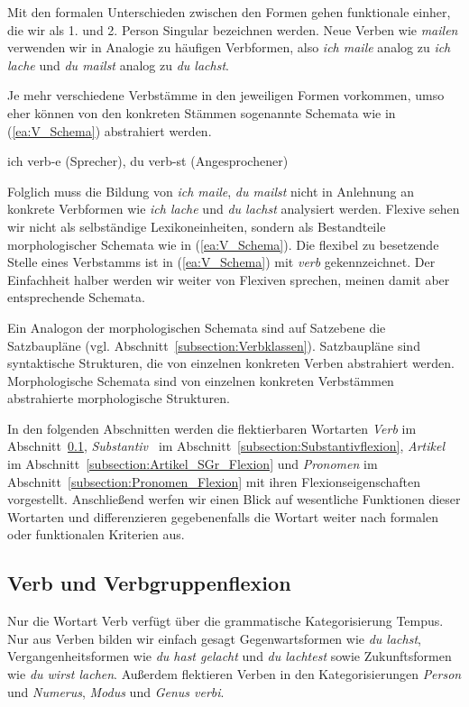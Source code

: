 Mit den formalen Unterschieden zwischen den Formen gehen funktionale einher, die wir als 1. und 2. Person Singular bezeichnen werden. Neue Verben wie \textit{mailen} verwenden wir in Analogie zu häufigen Verbformen, also \textit{ich maile} analog zu \textit{ich lache} und \textit{du mailst} analog zu \textit{du lachst}.

Je mehr verschiedene Verbstämme in den jeweiligen Formen vorkommen, umso eher können von den konkreten Stämmen sogenannte Schemata wie in (\ref{ea:V_Schema}) abstrahiert werden.

\ea \label{ea:V_Schema} ich verb-e (Sprecher), du verb-st (Angesprochener)
\z 

Folglich muss die Bildung von \textit{ich maile}, \textit{du mailst} nicht in Anlehnung an konkrete Verbformen wie \textit{ich lache} und \textit{du lachst} analysiert werden. Flexive sehen wir nicht als selbständige Lexikoneinheiten, sondern als Bestandteile morphologischer Schemata wie in (\ref{ea:V_Schema}). Die flexibel zu besetzende Stelle eines Verbstamms ist in (\ref{ea:V_Schema}) mit \textit{verb} gekennzeichnet. Der Einfachheit halber werden wir weiter von Flexiven sprechen, meinen damit aber entsprechende Schemata. 

Ein Analogon der morphologischen Schemata sind auf Satzebene die Satzbaupläne (vgl. Abschnitt~\ref{subsection:Verbklassen}). Satzbaupläne sind syntaktische Strukturen, die von einzelnen konkreten Verben abstrahiert werden. Morphologische Schemata sind von einzelnen konkreten Verbstämmen abstrahierte morphologische Strukturen.

In den folgenden Abschnitten werden die flektierbaren Wortarten \textit{Verb} im Abschnitt~\ref{subsection:Verbflexion}, \textit{Substantiv~} im Abschnitt~\ref{subsection:Substantivflexion}, \textit{Artikel} im Abschnitt~\ref{subsection:Artikel_SGr_Flexion} und \textit{Pronomen} im Abschnitt~\ref{subsection:Pronomen_Flexion} mit ihren Flexionseigenschaften vorgestellt. Anschließend werfen wir einen Blick auf wesentliche Funktionen dieser Wortarten und differenzieren gegebenenfalls die Wortart weiter nach formalen oder funktionalen Kriterien aus.  


\subsection{Verb und Verbgruppenflexion}\label{subsection:Verbflexion}

Nur die Wortart Verb verfügt über die grammatische Kategorisierung Tempus. Nur aus Verben bilden wir einfach gesagt Gegenwartsformen wie \textit{du lachst}, Vergangenheitsformen wie \textit{du hast gelacht} und \textit{du lachtest} sowie Zukunftsformen wie \textit{du wirst lachen}. Außerdem flektieren Verben in den Kategorisierungen \textit{Person} und \textit{Numerus}, \textit{Modus} und \textit{Genus verbi}. 


